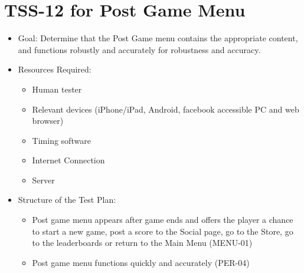 \section{TSS-12 for Post Game Menu}
\begin{itemize}
\item Goal: Determine that the Post Game menu contains the appropriate content, and functions robustly and accurately for robustness and accuracy.

\item Resources Required:
\begin{itemize}
\item Human tester
\item Relevant devices (iPhone/iPad, Android, facebook accessible PC and web browser)
\item Timing software
\item Internet Connection 
\item Server
\end{itemize}

\item Structure of the Test Plan: 
\begin{itemize}
\item Post game menu appears after game ends and offers the player a chance to start a new game, post a score to the Social page, go to the Store, go to the leaderboards or return to the Main Menu (MENU-01)
\item Post game menu functions quickly and accurately (PER-04)
\end{itemize}
\end{itemize}

